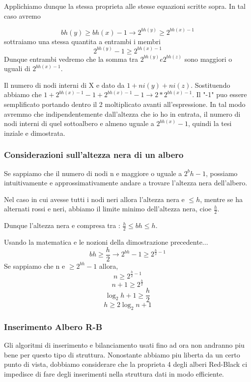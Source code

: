 \begin{itemize}
	Applichiamo dunque la stessa proprieta alle stesse equazioni scritte sopra. In tal caso avremo 
	
	$$bh(y) \ge bh(x) -1 \rightarrow 2^{bh(y)} \ge 2^{bh(x)-1} $$
	sottraiamo una stessa quantita a entrambi i membri
	$$2^{bh(y)}-1  \ge 2^{bh(x)-1}$$
	Dunque entrambi vedremo che la somma tra $2^{bh(y)} e 2^{bh(z)}$ sono maggiori o uguali di $2^{bh(x)-1}$.
	
	Il numero di nodi interni di X e dato da $1 + ni(y)+ ni(z)$. Sostituendo abbiamo che $1 + 2^{bh(x) - 1} -1 + 2^{bh(x)-1}-1 \rightarrow 2*2^{bh(x)-1}$. Il "-1" puo essere semplificato portando dentro il 2 moltiplicato avanti all'espressione. In tal modo avremmo che indipendentemente dall'altezza che io ho in entrata, il numero di nodi interni di quel sottoalbero e almeno uguale a $2^{bh(x)}-1$, quindi la tesi inziale e dimostrata.
	
	
\end{itemize}

\subsubsection{Considerazioni sull'altezza nera di un albero}

Se sappiamo che il numero di nodi n e maggiore o uguale a $2^bh -1$, possiamo intuitivamente e approssimativamente andare a trovare l'altezza nera dell'albero.

Nel caso in cui avesse tutti i nodi neri allora l'altezza nera e $\le h$, mentre se ha alternati rossi e neri, abbiamo il limite minimo dell'altezza nera, cioe $\frac{h}{2}$.

Dunque l'altezza nera e compresa tra : $\frac{h}{2} \le bh \le h$.

Usando la matematica e le nozioni della dimostrazione precedente...
$$bh \ge \frac{h}{2} \rightarrow 2^{bh} -1 \ge 2^{\frac{h}{2}-1}$$
Se sappiamo che n e $\ge 2^{bh}-1$ allora,
$$n \ge 2^{\frac{h}{2}-1}$$
$$n+1 \ge 2^{\frac{h}{2}}$$
$$\log_{2} h+1 \ge \frac{h}{2}$$
$$h \ge 2\log_{2} n+1$$

\subsubsection{Inserimento Albero R-B}
Gli algoritmi di inserimento e bilanciamento usati fino ad ora non andranno piu bene per questo tipo di struttura. Nonostante abbiamo piu liberta da un certo punto di vista, dobbiamo considerare che la proprieta 4 degli alberi Red-Black ci impedisce di fare degli inserimenti nella struttura dati in modo efficiente.


